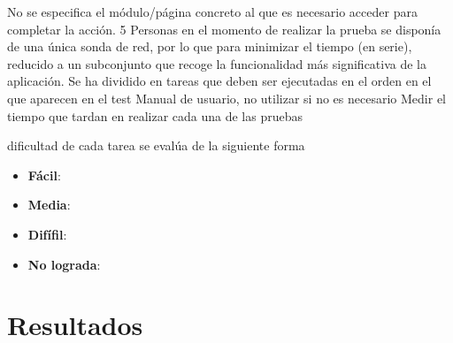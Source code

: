 \begin{table}[h]
\caption{Conjunto de preguntas que conforman el test de validación.}
\label{sec:pb:test}
\end{table}


No se especifica el módulo/página concreto al que es necesario acceder para completar la acción.
5 Personas
en el momento de realizar la prueba se disponía de una única sonda de red, por lo que para minimizar el tiempo (en serie), reducido a un subconjunto que recoge la funcionalidad más significativa de la aplicación.
Se ha dividido en tareas que deben ser ejecutadas en el orden en el que aparecen en el test
Manual de usuario, no utilizar si no es necesario
Medir el tiempo que tardan en realizar cada una de las pruebas

dificultad de cada tarea se evalúa de la siguiente forma
\begin{itemize}
  \item \textbf{Fácil}:
  \item \textbf{Media}:
  \item \textbf{Difífil}:
  \item \textbf{No lograda}:
\end{itemize}


\section{Resultados\label{sec:pb:resultados}}
